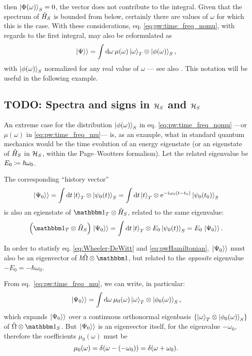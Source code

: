 then $\ket{\Phi(\omega)}_S = 0$, the vector does not contribute to the integral.
Given that the spectrum of $\hat{H}_S$ is bounded from below,
certainly there are values of $\omega$ for which this is the case.
With these considerations, eq. \eqref{eq:pw:time_freq_nomu}, with regards to the first integral, may also be reformulated as
\begin{equation}\label{eq:pw:time_freq_mu}
  \left.\left| \Psi \right\rangle\right\rangle =
    \int \dd{\omega} \mu(\omega) \ket{\omega}_{T} \otimes \ket{\phi(\omega)}_{S} \text{,}
\end{equation}
with $\ket{\phi(\omega)}_{S}$ normalized for any real value of $\omega$
--- see also \cite[eq.~(10)]{Lloyd:Time}.
This notation will be useful in the following example.

\subsection{TODO: Spectra and signs in $\mathcal{H}_S$ and $\mathcal{H}_S$}

An extreme case for the distribution $\ket{\phi(\omega)}_{S}$ in eq. \eqref{eq:pw:time_freq_nomu}
---or $\mu(\omega)$ in \eqref{eq:pw:time_freq_mu}---
is, as an example, what in standard quantum mechanics would be the time evolution of an energy eigenstate
(or an eigenstate of $\hat{H}_S$ in $\mathcal{H}_S$, within the Page--Wootters formalism).
Let the related eigenvalue be $E_0 \coloneqq \hbar\omega_{0}$.

The corresponding ``history vector''
\[
  \left.\left| \Psi_0 \right\rangle\right\rangle = \int \dd{t} \ket{t}_T \otimes \ket{\psi_0(t)}_S = \int \dd{t} \ket{t}_T \otimes \mathrm{e}^{-\mathrm{i}\mkern1mu \omega_0 (t-t_0)} \ket{\psi_0(t_0)}_S
\]
is also an egienstate of $\idop_T \ox \op{H}_S$, related to the same eigenvalue:
\[
  \qty(\idop_T \ox \op{H}_S) \dket{\Psi_0} = \int \dd{t} \ket{t}_T \ox E_0 \ket{\psi_{0}(t)}_S = E_0 \dket{\Psi_0} \text{.}
\]

In order to statisfy eq. \eqref{eq:Wheeler-DeWitt} and \eqref{eq:pwHamiltonian},
$\left.\left| \Psi_0 \right\rangle\right\rangle$ must also be an eigenvector of $\hbar\op{\Omega} \ox \idop$,
but related to the \emph{opposite} eigenvalue $-E_0 = -\hbar\omega_0$.

From eq.~\eqref{eq:pw:time_freq_mu}, we can write, in particular:
\begin{equation}
  \left.\left| \Psi_0 \right\rangle\right\rangle =
    \int \dd{\omega} \mu_0(\omega) \ket{\omega}_{T} \otimes \ket{\phi_0(\omega)}_{S} \text{,}
\end{equation}
which expands $\left.\left| \Psi_0 \right\rangle\right\rangle$ over a continuous orthonormal eigenbasis
$\left\{\ket{\omega}_{T} \otimes \ket{\phi_0(\omega)}_{S}\right\}$
of $\op{\Omega} \ox \idop_S$.
But $\left.\left| \Psi_0 \right\rangle\right\rangle$ is an eigenvector itself,
for the eigenvalue $-\omega_0$,
therefore the coefficients $\mu_0(\omega)$ must be
\begin{equation}
  \mu_0(\omega) = \delta\qty(\omega - \qty(-\omega_0) ) = \delta\qty(\omega + \omega_0) \text{.}
\end{equation}

